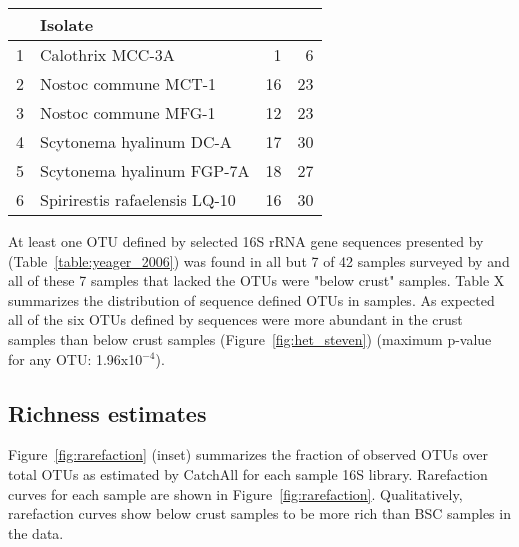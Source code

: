 \begin{table}[ht]
\centering
{\begin{tabular}{rlrr}
  \hline
 & Isolate & \citet{Garcia_Pichel_2013} & \citet{Steven_2013} \\ 
  \hline
1 & Calothrix MCC-3A &   1 &   6 \\ 
  2 & Nostoc commune MCT-1 &  16 &  23 \\ 
  3 & Nostoc commune MFG-1 &  12 &  23 \\ 
  4 & Scytonema hyalinum DC-A &  17 &  30 \\ 
  5 & Scytonema hyalinum FGP-7A &  18 &  27 \\ 
  6 & Spirirestis rafaelensis LQ-10 &  16 &  30 \\ 
   \hline
\end{tabular}}{}
\end{table}


At least one OTU defined by selected 16S rRNA gene sequences presented by
\citet{Yeager} (Table~\ref{table:yeager_2006}) was found in all but 7 of 42
samples surveyed by \citet{Steven_2013} and all of these 7 samples that lacked
the \citet{Yeager} OTUs were "below crust" samples. Table X summarizes the
distribution of \citet{Yeager} sequence defined OTUs in \citet{Steven_2013}
samples. As expected all of the six OTUs defined by \citet{Yeager} sequences
were more abundant in the crust samples than below crust samples
(Figure~\ref{fig:het_steven}) (maximum p-value for any OTU: 1.96x10$^{-4}$).

\subsection{Richness estimates}
Figure~\ref{fig:rarefaction} (inset) summarizes the fraction of observed OTUs
over total OTUs as estimated by CatchAll for each sample 16S library.
Rarefaction curves for each sample are shown in Figure~\ref{fig:rarefaction}.
Qualitatively, rarefaction curves show below crust samples to be more rich than
BSC samples in the \citet{Steven_2013} data.
